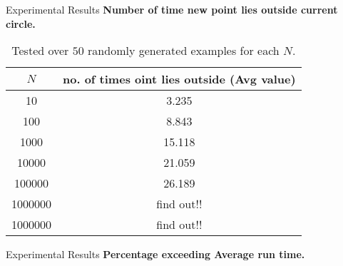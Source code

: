 \documentclass{beamer}
\begin{document}
\begin{frame}{Experimental Results}
\textbf{Number of time new point lies outside current circle.}
\begin{table}
\centering
\begin{tabular}{|c| c|} 
 \hline\hline
 $N$ & no. of times oint lies outside (Avg value) \\ [0.5ex] 
 \hline\hline
10 & 3.235
 \\ \hline
100 & 8.843
 \\ \hline
1000 & 15.118
 \\ \hline
10000 & 21.059
 \\ \hline
100000 & 26.189
 \\ \hline
1000000 & find out!!
 \\ \hline
1000000 & find out!!
 \\ \hline
\end{tabular}
\caption{Tested over $50$ randomly generated examples for each $N$.}\end{table}
\end{frame}


\begin{frame}{Experimental Results}
\textbf{Percentage exceeding Average run time.}
\begin{table}
\centering
{}
\caption{Tested over $250$ randomly generated examples for each $N$.}\end{table}
\end{frame}
\end{document}
